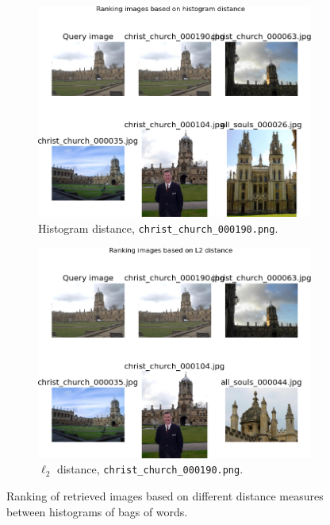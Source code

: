 \documentclass[a4paper,10pt,twoside]{article}
\begin{document}
\begin{figure}
\begin{subfigure}{0.47\textwidth}
    \includegraphics[width=\textwidth]{ranking_h_c}
    \caption{Histogram distance, \texttt{christ\_church\_000190.png}.}
  \end{subfigure}
  \hspace*{\fill}
  \begin{subfigure}{0.47\textwidth}
    \centering
    \includegraphics[width=\textwidth]{ranking_l_c}
    \caption{$\ell_2$ distance, \texttt{christ\_church\_000190.png}.}
  \end{subfigure}
  \caption{Ranking of retrieved images based on different distance measures between histograms of bags of words.}
  \label{fig:bow_retrieval}
\end{figure}
\end{document}
